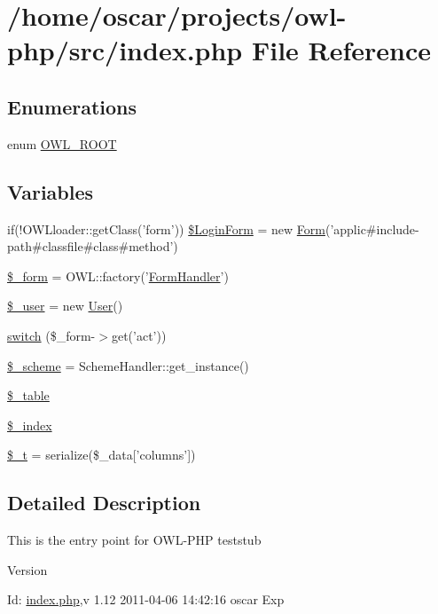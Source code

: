 \section{/home/oscar/projects/owl-\/php/src/index.php File Reference}
\label{index_8php}
\subsection*{Enumerations}
\begin{DoxyCompactItemize}
\item 
enum \hyperlink{index_8php_a35612f9a6bd7277982731a74593272c4}{OWL\_\-ROOT} 
\end{DoxyCompactItemize}
\subsection*{Variables}
\begin{DoxyCompactItemize}
\item 
if(!OWLloader::getClass('form')) \hyperlink{index_8php_ae89d28a5f6ccd73a8cb4a0253db78766}{\$LoginForm} = new \hyperlink{classForm}{Form}('applic\#include-\/path\#classfile\#class\#method')
\item 
\hyperlink{index_8php_ab14b242803551e0f269742a7103f149d}{\$\_\-form} = OWL::factory('\hyperlink{classFormHandler}{FormHandler}')
\item 
\hyperlink{index_8php_a5df5982b9dadc74df05081972cd67fdf}{\$\_\-user} = new \hyperlink{classUser}{User}()
\item 
\hyperlink{index_8php_aa284f7d5270c1aa684d885f7bb70d532}{switch} (\$\_\-form-\/$>$get('act'))
\item 
\hyperlink{index_8php_abb5321c25f21f089f5c253d5f2697502}{\$\_\-scheme} = SchemeHandler::get\_\-instance()
\item 
\hyperlink{index_8php_ac0ee5b766d19cb282552a3449a1f8376}{\$\_\-table}
\item 
\hyperlink{index_8php_a8fba9293fc0e3b428610c8208c00297d}{\$\_\-index}
\item 
\hyperlink{index_8php_a7a22c26026cc0626b015085e752b45cb}{\$\_\-t} = serialize(\$\_\-data\mbox{[}'columns'\mbox{]})
\end{DoxyCompactItemize}


\subsection{Detailed Description}
This is the entry point for OWL-\/PHP teststub \begin{DoxyVersion}{Version}

\end{DoxyVersion}
\begin{DoxyParagraph}{Id:}
\hyperlink{index_8php}{index.php},v 1.12 2011-\/04-\/06 14:42:16 oscar Exp 
\end{DoxyParagraph}


